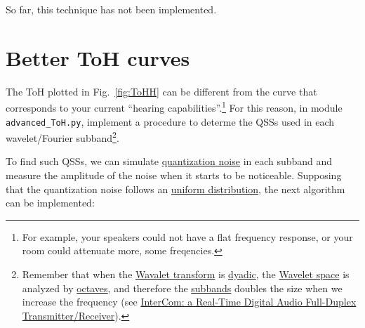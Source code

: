 \begin{comment}
will filter each DWT subband
considering the corresponding part of the ToH curve. To achieve this,
we will use the
\href{https://numpy.org/doc/stable/reference/routines.fft.html}{FFT
  (Fast Fourier Transform)} to map each DWT subband to the Fourier
domain and filter the signal using the ToH curve without generating a
significant increase or decrease in the signal energy. To do this, we
should quantize and dequantize each FFT subband, using the
corresponding QSS.

Finally, notice that (before using the FFT) a temporal window
(different from the square window, which is the one we are using if
we don't apply a
\href{https://en.wikipedia.org/wiki/Window_function}{windowing
  technique}) should be used to minimize the
\href{https://en.wikipedia.org/wiki/Spectral_leakage}{spectral
  leakage}.
\end{comment}

So far, this technique has not been implemented.

\section{Better ToH curves}
\label{sec:better_ToH}

The ToH plotted in Fig.~\ref{fig:ToHH} can be
different from the curve that corresponds to your current ``hearing
capabilities''.\footnote{For example, your speakers could not have a
  flat frequency response, or your room could attenuate more, some
  freqencies.} For this reason, in module \verb|advanced_ToH.py|,
implement a procedure to determe the QSSs used in
each wavelet/Fourier subband\footnote{Remember that when the
  \href{https://en.wikipedia.org/wiki/Wavelet_transform}{Wavalet
    transform} is
  \href{https://en.wikipedia.org/wiki/Dyadic_rational}{dyadic}, the
  \href{https://en.wikipedia.org/wiki/Discrete_wavelet_transform}{Wavelet
    space} is analyzed by
  \href{https://en.wikipedia.org/wiki/Octave_band}{octaves}, and
  therefore the
  \href{https://en.wikipedia.org/wiki/Filter_bank}{subbands} doubles
  the size when we increase the frequency (see \href{https://github.com/Tecnologias-multimedia/InterCom/blob/master/docs/2-hours_seminar.ipynb}{
  InterCom: a Real-Time Digital Audio Full-Duplex
  Transmitter/Receiver}).}.
  
To find such QSSs, we can simulate
\href{https://en.wikipedia.org/wiki/Quantization_(signal_processing)}{quantization
  noise} in each subband and measure the amplitude of the noise when
it starts to be noticeable. Supposing that the quantization noise
follows an
\href{https://en.wikipedia.org/wiki/Continuous_uniform_distribution}{uniform
  distribution}, the next algorithm can be implemented:

